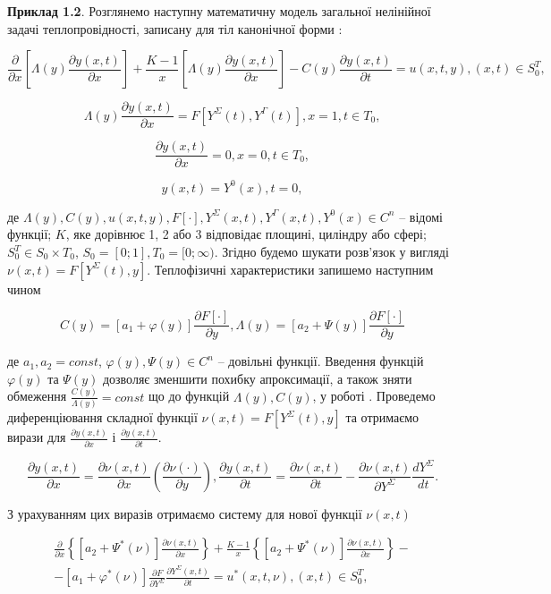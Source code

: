 \textbf{Приклад 1.2}. Розглянемо наступну математичну модель загальної нелінійної задачі
теплопровідності, записану для тіл канонічної форми \cite{Kozdoba-Metody}:

$$
\frac{\partial}{\partial x} \left[\Lambda(y)\frac{\partial y(x,t)}{\partial x} \right]
+ \frac{K - 1}{x}\left[ \Lambda(y)\frac{\partial y(x,t)}{\partial x} \right]
- C(y) \frac{\partial y(x,t)}{\partial t} = u(x, t, y), (x, t) \in S_0^T,
$$

$$
\Lambda(y)\frac{\partial y(x, t)}{\partial x} = F\left[Y^\Sigma(t), Y^\Gamma(t) \right], x = 1, t\in T_0,
$$

$$
\frac{\partial y(x, t)}{\partial x} = 0, x = 0, t\in T_0,
$$

$$
y(x, t) = Y^0(x), t = 0,
$$

де $\Lambda(y), C(y), u(x,t, y), F[\cdot], Y^\Sigma(x, t), Y^\Gamma(x, t), Y^0(x) \in C^n$ – відомі функції;
$K$, яке дорівнює 1, 2 або 3 відповідає площині, циліндру або сфері; $S_0^T \in S_0 \times T_0$, $S_0=[0; 1],
T_0=[0; \infty)$.
Згідно \cite{Furman-Reshenie} будемо шукати розв’язок у вигляді $\nu(x, t) = F[Y^\Sigma(t), y]$.
Теплофізичні характеристики запишемо наступним чином

$$
C(y) = [a_1 + \varphi(y)] \frac{\partial F[\cdot]}{\partial y},
\Lambda(y) = [a_2 + \Psi(y)] \frac{\partial F[\cdot]}{\partial y}
$$

де $a_1, a_2 = const$, $\varphi(y), \Psi(y) \in C^n$ – довільні функції. Введення функцій $\varphi(y)$ та $\Psi(y)$
дозволяє зменшити похибку апроксимації,
а також зняти обмеження $\frac{C(y)}{\Lambda(y)} = const$ що до функцій $\Lambda(y), C(y)$, у роботі \cite{Furman-Reshenie}. Проведемо диференціювання складної
функції $\nu(x, t) = F[Y^\Sigma(t), y]$ та отримаємо вирази для $\frac{\partial y(x, t)}{\partial x}$ і
$\frac{\partial y(x, t)}{\partial t}$.

$$
\frac{\partial y(x, t)}{\partial x} = \frac{\partial\nu(x,t)}{\partial x}\left(\frac{\partial\nu(\cdot)}{\partial y} \right),
\frac{\partial y(x, t)}{\partial t} = \frac{\partial\nu(x,t)}{\partial t} - \frac{\partial\nu(x, t)}{\partial Y^\Sigma} \frac{dY^\Sigma}{dt}.
$$

З урахуванням цих виразів отримаємо систему для нової функції $\nu(x, t)$

\begin{equation}
\label{eq:major_non_lin_p1}
\begin{multlined}
\frac{\partial}{\partial x}\left\{[a_2 + \Psi^*(\nu)]\frac{\partial\nu(x, t)}{\partial x}\right\} +
\frac{K - 1}{x}\left\{[a_2 + \Psi^*(\nu)]\frac{\partial\nu(x, t)}{\partial x} \right\} - \\
- [a_1 + \varphi^*(\nu)]\frac{\partial F}{\partial Y^\Sigma}\frac{\partial Y^\Sigma(x, t)}{\partial t} =
u^*(x, t, \nu), (x, t) \in S_0^T,
\end{multlined}
\end{equation}

